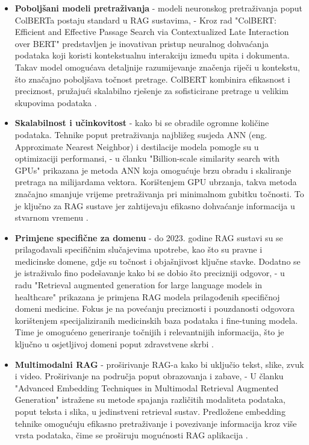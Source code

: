 \documentclass[]{foi}
\begin{document}
\begin{itemize}
    \item \textbf{Poboljšani modeli pretraživanja} - modeli neuronskog pretraživanja poput ColBERTa postaju standard u RAG sustavima,
    \subitem - Kroz rad "ColBERT: Efficient and Effective Passage Search via Contextualized Late Interaction over BERT" predstavljen je inovativan pristup
    neuralnog dohvaćanja podataka koji koristi kontekstualnu interakciju između upita i dokumenta. Takav model omogućava detaljnije razumijevanje značenja riječi u kontekstu, što značajno
    poboljšava točnost pretrage. ColBERT kombinira efikasnost i preciznost, pružajući skalabilno rješenje za sofisticirane pretrage u velikim skupovima podataka \cite{khattab2020colbert}.

    \item \textbf{Skalabilnost i učinkovitost} - kako bi se obradile ogromne količine podataka. Tehnike poput pretraživanja najbližeg susjeda ANN (eng. Approximate Nearest Neighbor) i destilacije modela pomogle su u optimizaciji performansi,
    \subitem - u članku "Billion-scale similarity search with GPUs" prikazana je metoda ANN koja omogućuje brzu obradu i skaliranje
    pretraga na milijardama vektora. Korištenjem GPU ubrzanja, takva metoda značajno smanjuje vrijeme pretraživanja pri minimalnom gubitku točnosti. To je ključno za RAG sustave
    jer zahtijevaju efikasno dohvaćanje informacija u stvarnom vremenu \cite{zhao2020song}. 

    \item \textbf{Primjene specifične za domenu} - do 2023. godine RAG sustavi su se prilagođavali specifičnim slučajevima upotrebe, kao što su pravne i medicinske domene, gdje su točnost i objašnjivost ključne stavke. Dodatno se je istraživalo fino podešavanje kako bi se dobio što precizniji odgovor, 
    \subitem - u radu "Retrieval augmented generation for large language models in healthcare" prikazana je primjena RAG modela prilagođenih specifičnoj domeni medicine.
    Fokus je na povećanju preciznosti i pouzdanosti odgovora korištenjem specijaliziranih medicinskih baza podataka i fine-tuning modela. Time je omogućeno generiranje
    točnijih i relevantnijih informacija, što je ključno u osjetljivoj domeni poput zdravstvene skrbi \cite{amugongo2025rag}.

    \item \textbf{Multimodalni RAG} - proširivanje RAG-a kako bi uključio tekst, slike, zvuk i video. Proširivanje na područja poput obrazovanja i zabave, 
    \subitem - U članku "Advanced Embedding Techniques in Multimodal Retrieval Augmented Generation" istražene su metode spajanja različitih modaliteta podataka, poput teksta
    i slika, u jedinstveni retrieval sustav. Predložene embedding tehnike omogućuju efikasno pretraživanje i povezivanje informacija kroz više vrsta podataka, čime se
    proširuju mogućnosti RAG aplikacija \cite{zhou2024advanced}.


\end{itemize}
\end{document}
